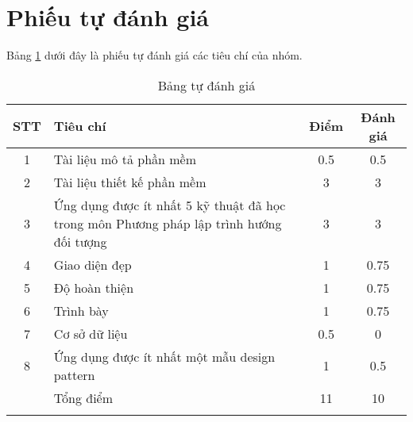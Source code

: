 \section{Phiếu tự đánh giá}
Bảng \ref{points} dưới đây là phiếu tự đánh giá các tiêu chí của nhóm.
\begin{longtable}{|c| p{}|c|c|} 
\hline 
STT & Tiêu chí & Điểm & Đánh giá \\ 
\hline 
1 & Tài liệu mô tả phần mềm & 0.5 & 0.5 \\ 
\hline 
2 & Tài liệu thiết kế phần mềm & 3 & 3 \\ 
\hline 
3 & Ứng dụng được ít nhất 5 kỹ thuật đã học trong môn Phương pháp lập trình hướng đối tượng & 3 & 3 \\ 
\hline 
4 & Giao diện đẹp & 1 & 0.75 \\ 
\hline 
5 & Độ hoàn thiện & 1 & 0.75 \\ 
\hline 
6 & Trình bày & 1 & 0.75 \\ 
\hline 
7 & Cơ sở dữ liệu & 0.5 & 0 \\ 
\hline 
8 & Ứng dụng được ít nhất một mẫu design pattern & 1 & 0.5 \\ 
\hline 
& Tổng điểm & 11 & 10 \\ 
\hline 
\caption{Bảng tự đánh giá}
\label{points}
\end{longtable} 